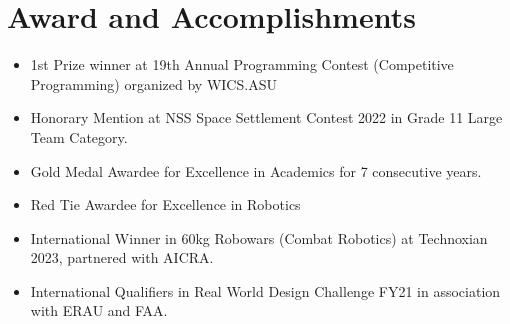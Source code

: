 \documentclass[letterpaper,11pt]{article}
\newcommand{\resumeItem}[1]{
  \item\small{
    {#1 \vspace{-2pt}}
  }
}
\newcommand{\resumeItemListStart}{\begin{itemize}}
\newcommand{\resumeItemListEnd}{\end{itemize}\vspace{-5pt}}
\begin{document}
\section{Award and Accomplishments}
    \resumeItemListStart
        \resumeItem{1st Prize winner at 19th Annual Programming Contest (Competitive Programming) organized by WICS.ASU}
        \vspace{-3pt}
        \resumeItem{Honorary Mention at NSS Space Settlement Contest 2022 in Grade 11 Large Team Category.}
        \vspace{-3pt}
        \resumeItem{Gold Medal Awardee for Excellence in Academics for 7 consecutive years.}
        \vspace{-3pt}
        \resumeItem{Red Tie Awardee for Excellence in Robotics}
        \vspace{-3pt}
        \resumeItem{International Winner in 60kg Robowars (Combat Robotics) at Technoxian 2023, partnered with AICRA.}
        \vspace{-3pt}
        \resumeItem{International Qualifiers in Real World Design Challenge FY21 in association with ERAU and FAA.}
    \resumeItemListEnd
\end{document}
